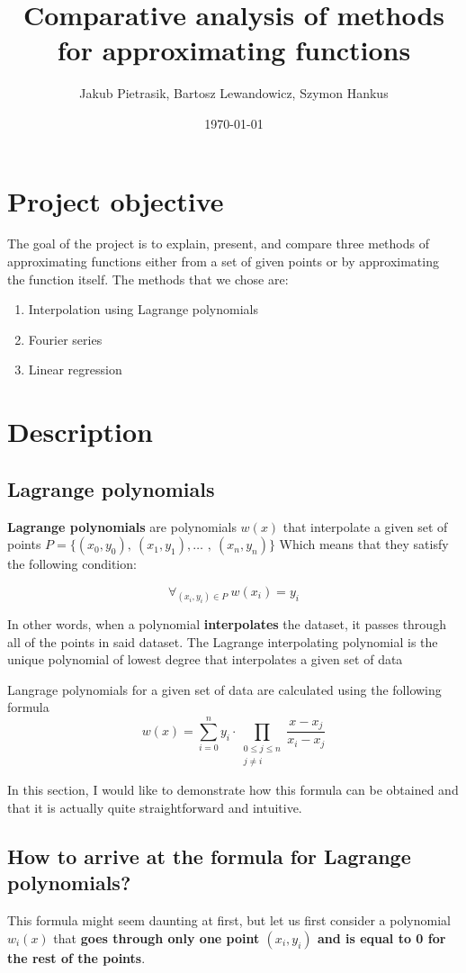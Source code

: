 \documentclass{MathematicaReport}
\date{\today}
\title{Comparative analysis of methods for approximating functions}
\author{Jakub Pietrasik, Bartosz Lewandowicz, Szymon Hankus}
\begin{document}
\maketitle

\section{Project objective}
The goal of the project is to explain, present, and compare three methods of
approximating functions either from a set of given points or by approximating
the function itself. The methods that we chose are:
\begin{enumerate}
	\item Interpolation using Lagrange polynomials
	\item Fourier series
	\item Linear regression
\end{enumerate}

\section{Description} 
\subsection{Lagrange polynomials}
\textbf{Lagrange polynomials} are polynomials \( w(x) \) that interpolate a 
given set of points
\( P = \{ (x_0, y_0)\)\(,\ (x_1, y_1)\)\(,\ldots\) \(,\ (x_n, y_n) \} \)
Which means that they satisfy the following condition:

\[
	\forall_{(x_i, y_i) \in P}\ w(x_i) = y_i
\]

In other words, when a polynomial \textbf{interpolates} the dataset, it passes 
through all of the points in said dataset.
The Lagrange interpolating polynomial is the unique polynomial of lowest degree 
that interpolates a given set of data

Langrage polynomials for a given set of data are calculated using the following
formula
\[
	w(x) = \sum_{i=0}^n y_i \cdot \prod_{\begin{smallmatrix}0\le j\le n\\ j\neq i\end{smallmatrix}}
	 \frac{x-x_j}{x_i-x_j}
\]

In this section, I would like to demonstrate how this formula can be obtained
and that it is actually quite straightforward and intuitive.

\subsection{How to arrive at the formula for Lagrange polynomials?}
This formula might seem daunting at first, but let us first consider a
polynomial \( w_i(x) \) that \textbf{goes through only one point \( (x_i, y_i) \) 
and is equal to 0 for the rest of the points}.
\end{document}
